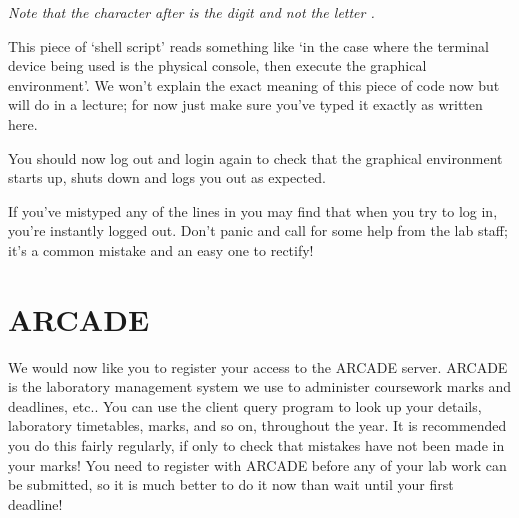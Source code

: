\emph{Note that the character after  is the digit  and not the letter .}

This piece of `shell script' reads something like `in the case where the terminal device being used is the physical console, then execute the graphical environment'. We won't explain the exact meaning of this piece of code now but will do in a lecture; for now just make sure you've typed it exactly as written here.

You should now log out and login again to check that the graphical environment starts up, shuts down and logs you out as expected.

If you've mistyped any of the lines in  you may find that when you try to log in, you're instantly logged out. Don't panic and call for some help from the lab staff; it's a common mistake and an easy one to rectify!







\FloatBarrier

\section{ARCADE}

We would now like you to register your access to the ARCADE server. ARCADE is the laboratory management system we use to administer coursework marks and deadlines, etc.. You can use the client query program to look up your details, laboratory timetables, marks, and so on, throughout the year. It is recommended you do this fairly regularly, if only to check that mistakes have not been made in your marks! You need to register with ARCADE before any of your lab work can be submitted, so it is much better to do it now than wait until your first deadline!

